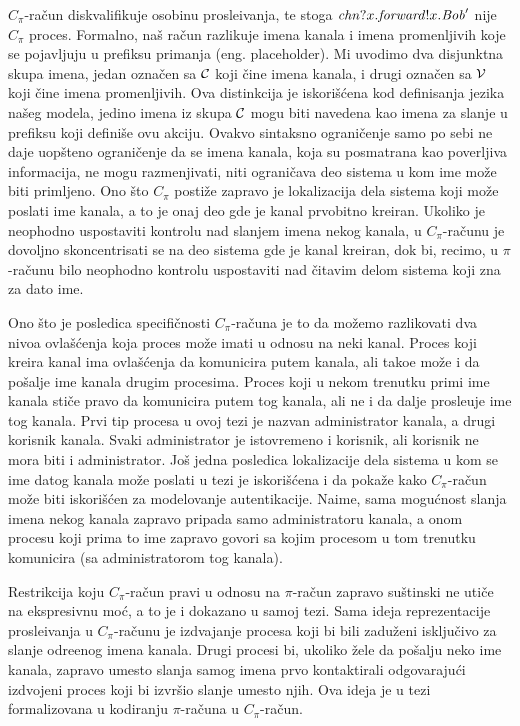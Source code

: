 $C_\pi$-ra\v cun diskvalifikuje osobinu prosle\dj ivanja, te stoga $\mathit{chn}?x.\mathit{forward}!x.\mathit{Bob}'$ nije $C_\pi$ proces. Formalno, na\v s ra\v cun razlikuje imena kanala i imena promenljivih koje se pojavljuju u prefiksu primanja (eng. placeholder). Mi uvodimo dva disjunktna skupa imena, jedan ozna\v cen sa ${\cal C}$ koji \v cine imena kanala, i drugi ozna\v cen sa ${\cal V}$ koji \v cine imena promenljivih. Ova distinkcija je iskori\v s\' cena kod definisanja jezika na\v seg modela, jedino imena iz skupa ${\cal C}$ mogu biti navedena kao imena za slanje u prefiksu koji defini\v se ovu akciju. 
Ovakvo sintaksno ograni\v cenje samo po sebi ne daje uop\v steno ograni\v cenje da se imena kanala, koja su posmatrana kao poverljiva informacija, ne mogu razmenjivati, niti ograni\v cava deo sistema u kom ime mo\v ze biti primljeno. Ono \v sto $C_\pi$ posti\v ze zapravo je lokalizacija dela sistema koji mo\v ze poslati ime kanala, a to je onaj deo gde je kanal prvobitno kreiran. Ukoliko je neophodno uspostaviti kontrolu nad slanjem imena nekog kanala, u $C_\pi$-ra\v cunu je dovoljno skoncentrisati se na deo sistema gde je kanal kreiran, dok bi, recimo, u $\pi$-ra\v cunu bilo neophodno kontrolu uspostaviti nad \v citavim delom sistema koji zna za dato ime. 

Ono \v sto je posledica specifi\v cnosti $C_\pi$-ra\v cuna je to da mo\v zemo razlikovati dva nivoa ovla\v s\' cenja koja proces mo\v ze imati u odnosu na neki kanal. Proces koji kreira kanal ima ovla\v s\' cenja da komunicira putem kanala, ali tako\dj e mo\v ze i da po\v salje ime kanala drugim procesima. Proces koji u nekom trenutku primi ime kanala sti\v ce pravo da komunicira putem tog kanala, ali ne i da dalje prosle\dj uje ime tog kanala. Prvi tip procesa u ovoj tezi je nazvan administrator kanala, a drugi korisnik kanala. Svaki administrator je istovremeno i korisnik, ali korisnik ne mora biti i administrator. 
Jo\v s jedna posledica lokalizacije dela sistema u kom se ime datog kanala mo\v ze poslati u tezi je iskori\v s\' cena i da poka\v ze kako $C_\pi$-ra\v cun mo\v ze biti iskori\v s\' cen za modelovanje autentikacije. Naime, sama mogu\' cnost slanja imena nekog kanala zapravo pripada samo administratoru kanala, a onom procesu koji prima to ime zapravo govori sa kojim procesom u tom trenutku komunicira (sa administratorom tog kanala).

Restrikcija koju $C_\pi$-ra\v cun pravi u odnosu na $\pi$-ra\v cun zapravo su\v stinski ne uti\v ce na ekspresivnu mo\' c, a to je i dokazano u samoj tezi. Sama ideja reprezentacije prosle\dj ivanja u $C_\pi$-ra\v cunu je izdvajanje procesa koji bi bili zadu\v zeni isklju\v civo za slanje odre\dj enog imena kanala. Drugi procesi bi, ukoliko \v zele da po\v salju neko ime kanala, zapravo umesto slanja samog imena prvo kontaktirali odgovaraju\' ci izdvojeni proces koji bi izvr\v sio slanje umesto njih. Ova ideja je u tezi formalizovana u kodiranju $\pi$-ra\v cuna u $C_\pi$-ra\v cun. 

